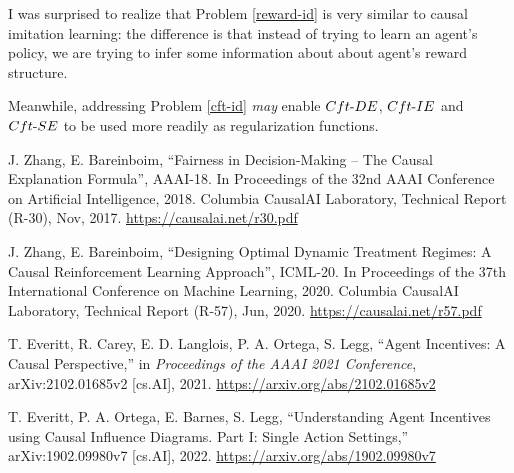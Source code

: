 \documentclass[letterpaper,10pt]{article}
\begin{document}
I was surprised to realize that Problem \ref{reward-id} is very similar to causal imitation learning: the difference is that instead of trying to learn an agent's policy, we are trying to infer some information about about agent's reward structure. 

Meanwhile, addressing Problem \ref{cft-id} \emph{may} enable $Cft{\text -}DE$,\hspace{1pt} $Cft{\text -}IE$ and $Cft{\text -}SE$ to be used more readily as regularization functions.



\newpage
%  
\begin{thebibliography}{99} %

J. Zhang, E. Bareinboim,
``Fairness in Decision-Making – The Causal Explanation Formula'',
AAAI-18. In Proceedings of the 32nd AAAI Conference on Artificial Intelligence, 2018.
Columbia CausalAI Laboratory, Technical Report (R-30), Nov, 2017.
\url{https://causalai.net/r30.pdf}

J. Zhang, E. Bareinboim,
``Designing Optimal Dynamic Treatment Regimes: A Causal Reinforcement Learning Approach'', ICML-20. In Proceedings of the 37th International Conference on Machine Learning, 2020.
Columbia CausalAI Laboratory, Technical Report (R-57), Jun, 2020. 
\url{https://causalai.net/r57.pdf}

T. Everitt, R. Carey, E. D. Langlois, P. A. Ortega, S. Legg,
``Agent Incentives: A Causal Perspective,''
in \emph{Proceedings of the AAAI 2021 Conference}, 
arXiv:2102.01685v2 [cs.AI], 2021.
\url{https://arxiv.org/abs/2102.01685v2}

T. Everitt, P. A. Ortega, E. Barnes, S. Legg,
``Understanding Agent Incentives using Causal Influence Diagrams. Part I: Single Action Settings,'' arXiv:1902.09980v7 [cs.AI], 2022.
\url{https://arxiv.org/abs/1902.09980v7}







\end{thebibliography}
\end{document}
